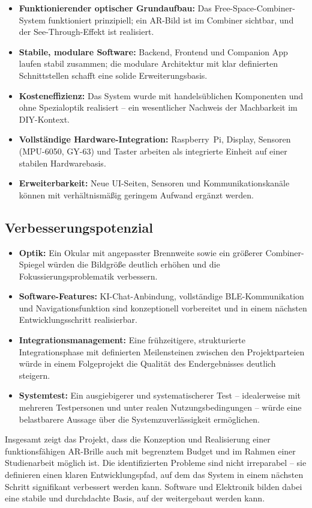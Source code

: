 \begin{itemize}
  \item \textbf{Funktionierender optischer Grundaufbau:}
    Das Free-Space-Combiner-System funktioniert prinzipiell; ein AR-Bild
    ist im Combiner sichtbar, und der See-Through-Effekt ist realisiert.
  \item \textbf{Stabile, modulare Software:}
    Backend, Frontend und Companion App laufen stabil zusammen;
    die modulare Architektur mit klar definierten Schnittstellen schafft
    eine solide Erweiterungsbasis.
  \item \textbf{Kosteneffizienz:}
    Das System wurde mit handelsüblichen Komponenten und ohne Spezialoptik
    realisiert -- ein wesentlicher Nachweis der Machbarkeit im DIY-Kontext.
  \item \textbf{Vollständige Hardware-Integration:}
    Raspberry~Pi, Display, Sensoren (MPU-6050, GY-63) und Taster
    arbeiten als integrierte Einheit auf einer stabilen Hardwarebasis.
  \item \textbf{Erweiterbarkeit:}
    Neue UI-Seiten, Sensoren und Kommunikationskanäle können mit
    verhältnismäßig geringem Aufwand ergänzt werden.
\end{itemize}

\newpage
\subsection{Verbesserungspotenzial}
\label{subsec:verbesserungspotenzial}

\begin{itemize}
  \item \textbf{Optik:}
    Ein Okular mit angepasster Brennweite sowie ein größerer Combiner-Spiegel
    würden die Bildgröße deutlich erhöhen und die Fokussierungsproblematik
    verbessern.
  \item \textbf{Software-Features:}
    KI-Chat-Anbindung, vollständige BLE-Kommunikation und Navigationsfunktion
    sind konzeptionell vorbereitet und in einem nächsten Entwicklungsschritt
    realisierbar.
  \item \textbf{Integrationsmanagement:}
    Eine frühzeitigere, strukturierte Integrationsphase mit definierten
    Meilensteinen zwischen den Projektparteien würde in einem Folgeprojekt
    die Qualität des Endergebnisses deutlich steigern.
  \item \textbf{Systemtest:}
    Ein ausgiebigerer und systematischerer Test -- idealerweise mit mehreren
    Testpersonen und unter realen Nutzungsbedingungen -- würde eine
    belastbarere Aussage über die Systemzuverlässigkeit ermöglichen.
\end{itemize}

Insgesamt zeigt das Projekt, dass die Konzeption und Realisierung einer
funktionsfähigen AR-Brille auch mit begrenztem Budget und im Rahmen einer
Studienarbeit möglich ist.
Die identifizierten Probleme sind nicht irreparabel -- sie definieren einen
klaren Entwicklungspfad, auf dem das System in einem nächsten Schritt
signifikant verbessert werden kann.
Software und Elektronik bilden dabei eine stabile und durchdachte Basis,
auf der weitergebaut werden kann.

